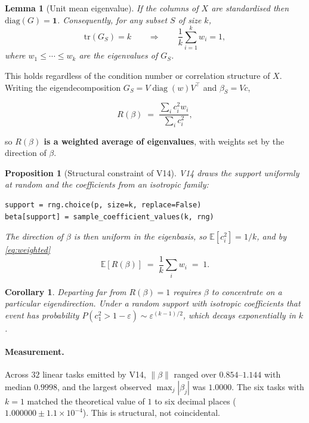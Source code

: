\documentclass[11pt]{article}
\newtheorem{lemma}{Lemma}
\newtheorem{proposition}{Proposition}
\newtheorem{corollary}{Corollary}
\newcommand{\Rq}{R(\beta)}
\begin{document}
\begin{lemma}[Unit mean eigenvalue]
If the columns of $X$ are standardised then $\mathrm{diag}(G) = \mathbf{1}$.
Consequently, for \emph{any} subset $S$ of size $k$,
\[
\mathrm{tr}(G_S) = k
\qquad\Longrightarrow\qquad
\frac{1}{k}\sum_{i=1}^{k} w_i = 1 ,
\]
where $w_1 \le \cdots \le w_k$ are the eigenvalues of $G_S$.
\end{lemma}

This holds regardless of the condition number or correlation structure of
$X$. Writing the eigendecomposition $G_S = V \operatorname{diag}(w) V^\top$
and $\beta_S = Vc$,

\begin{equation}
\Rq \;=\; \frac{\sum_i c_i^2 w_i}{\sum_i c_i^2},
\label{eq:weighted}
\end{equation}

so \textbf{$\Rq$ is a weighted average of eigenvalues}, with weights set by
the direction of $\beta$.

\begin{proposition}[Structural constraint of V14]
V14 draws the support uniformly at random and the coefficients from an
isotropic family:
\begin{verbatim}
support = rng.choice(p, size=k, replace=False)
beta[support] = sample_coefficient_values(k, rng)
\end{verbatim}
The direction of $\beta$ is then uniform in the eigenbasis, so
$\mathbb{E}[c_i^2] = 1/k$, and by \eqref{eq:weighted}
\[
\mathbb{E}[\Rq] \;=\; \frac{1}{k}\sum_i w_i \;=\; 1 .
\]
\end{proposition}

\begin{corollary}
Departing far from $\Rq = 1$ requires $\beta$ to concentrate on a particular
eigendirection. Under a random support with isotropic coefficients that
event has probability $P(c_1^2 > 1-\varepsilon) \sim \varepsilon^{(k-1)/2}$,
which decays exponentially in $k$.
\end{corollary}

\paragraph{Measurement.}
Across $32$ linear tasks emitted by V14, $\|\beta\|$ ranged over
$0.854$--$1.144$ with median $0.9998$, and the largest observed
$\max_j|\beta_j|$ was $1.0000$. The six tasks with $k=1$ matched the
theoretical value of $1$ to six decimal places
($1.000000 \pm 1.1\times10^{-4}$). This is structural, not coincidental.
\end{document}
